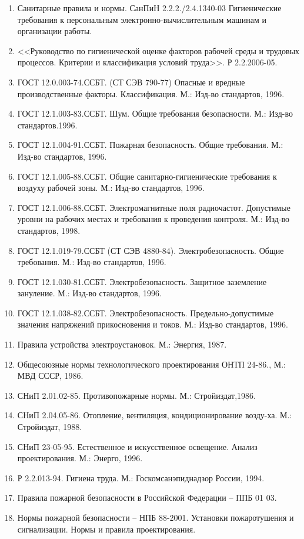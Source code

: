 \begin{enumerate}[1.]
	\item Санитарные правила и нормы. СанПиН 2.2.2./2.4.1340-03 Гигиенические требования к персональным электронно-вычислительным машинам и организации работы. 
	\item <<Руководство по гигиенической оценке факторов рабочей среды  и трудовых процессов. Критерии и классификация условий труда>>. Р 2.2.2006-05.
	\item ГОСТ 12.0.003-74.ССБТ. (СТ СЭВ 790-77) Опасные и вредные производственные факторы. Классификация. М.: Изд-во стандартов, 1996.
	\item ГОСТ 12.1.003-83.ССБТ. Шум. Общие требования безопасности. М.: Изд-во стандартов.1996.
	\item ГОСТ 12.1.004-91.ССБТ. Пожарная безопасность. Общие требования. М.: Изд-во стандартов, 1996.
	\item ГОСТ 12.1.005-88.ССБТ. Общие санитарно-гигиенические требования к воздуху рабочей зоны. М.: Изд-во стандартов, 1996.
	\item ГОСТ 12.1.006-88.ССБТ. Электромагнитные поля  радиочастот. Допустимые уровни на рабочих местах и требования к проведения контроля. М.: Изд-во стандартов, 1998.
	\item ГОСТ 12.1.019-79.ССБТ (СТ СЭВ 4880-84). Электробезопасность. Общие требования. М.: Изд-во стандартов, 1996.
	\item ГОСТ 12.1.030-81.ССБТ. Электробезопасность. Защитное заземление зануление. М.: Изд-во стандартов, 1996.
	\item ГОСТ 12.1.038-82.ССБТ. Электробезопасность. Предельно-допустимые значения напряжений прикосновения и токов. М.: Изд-во стандартов, 1996.
	\item Правила устройства электроустановок. М.: Энергия, 1987.
	\item Общесоюзные нормы технологического проектирования ОНТП 24-86., М.: МВД СССР, 1986.
	\item СНиП 2.01.02-85. Противопожарные нормы. М.: Стройиздат,1986.
	\item СНиП 2.04.05-86. Отопление, вентиляция, кондиционирование возду-ха. М.: Стройиздат, 1988.
	\item СНиП 23-05-95. Естественное и искусственное освещение. Анализ проектирования. М.: Энерго, 1996.
	\item Р 2.2.013-94. Гигиена труда. М.: Госкомсанэпиднадзор России, 1994.
	\item Правила пожарной безопасности в Российской Федерации – ППБ 01 03. 
	\item Нормы пожарной безопасности – НПБ 88-2001. Установки пожаротушения и сигнализации. Нормы и правила проектирования.
\end{enumerate}

